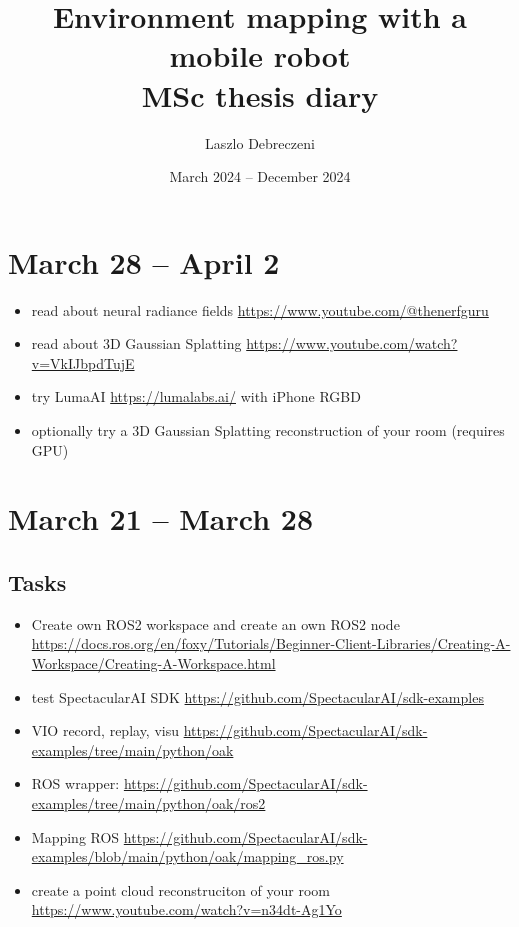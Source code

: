 \documentclass{article}
\title{Environment mapping with a mobile robot \\
\Large MSc thesis diary}
\author{Laszlo Debreczeni}
\date{March 2024 -- December 2024}
\begin{document}
\maketitle

\tableofcontents
\newpage

\section{March 28 -- April 2}
\begin{itemize}
\item read about neural radiance fields \url{https://www.youtube.com/@thenerfguru}
\item read about 3D Gaussian Splatting \url{https://www.youtube.com/watch?v=VkIJbpdTujE}
\item try LumaAI \url{https://lumalabs.ai/} with iPhone RGBD
\item optionally try a 3D Gaussian Splatting reconstruction of your room (requires GPU) 
\end{itemize}
\newpage

\section{March 21 -- March 28}

\subsection{Tasks}
\begin{itemize}
\item Create own ROS2 workspace and create an own ROS2 node \url{https://docs.ros.org/en/foxy/Tutorials/Beginner-Client-Libraries/Creating-A-Workspace/Creating-A-Workspace.html} 
\item test SpectacularAI SDK \url{https://github.com/SpectacularAI/sdk-examples} 
\item VIO record, replay, visu \url{https://github.com/SpectacularAI/sdk-examples/tree/main/python/oak}
\item ROS wrapper: \url{https://github.com/SpectacularAI/sdk-examples/tree/main/python/oak/ros2}
\item Mapping ROS \url{https://github.com/SpectacularAI/sdk-examples/blob/main/python/oak/mapping_ros.py}

\item create a point cloud reconstruciton of your room
\url{https://www.youtube.com/watch?v=n34dt-Ag1Yo}
\end{itemize}
\end{document}
